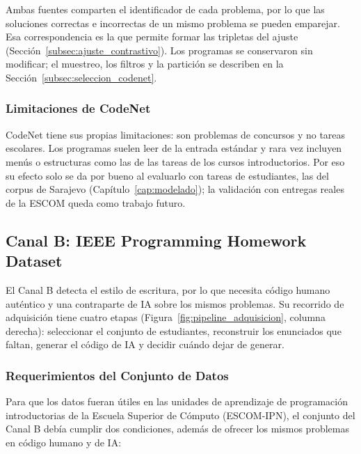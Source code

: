 Ambas fuentes comparten el identificador de cada problema, por lo que las soluciones correctas e incorrectas de un mismo problema se pueden emparejar. Esa correspondencia es la que permite formar las tripletas del ajuste (Sección~\ref{subsec:ajuste_contrastivo}). Los programas se conservaron sin modificar; el muestreo, los filtros y la partición se describen en la Sección~\ref{subsec:seleccion_codenet}.

\subsubsection{Limitaciones de CodeNet}
\label{subsec:limitaciones_codenet}

CodeNet tiene sus propias limitaciones: son problemas de concursos y no tareas escolares. Los programas suelen leer de la entrada estándar y rara vez incluyen menús o estructuras como las de las tareas de los cursos introductorios. Por eso su efecto solo se da por bueno al evaluarlo con tareas de estudiantes, las del corpus de Sarajevo (Capítulo~\ref{cap:modelado}); la validación con entregas reales de la ESCOM queda como trabajo futuro.

\subsection{Canal B: IEEE Programming Homework Dataset}
\label{subsec:adquisicion_canal_b}

El Canal B detecta el estilo de escritura, por lo que necesita código humano auténtico y una contraparte de IA sobre los mismos problemas. Su recorrido de adquisición tiene cuatro etapas (Figura~\ref{fig:pipeline_adquisicion}, columna derecha): seleccionar el conjunto de estudiantes, reconstruir los enunciados que faltan, generar el código de IA y decidir cuándo dejar de generar.

\subsubsection{Requerimientos del Conjunto de Datos}
\label{subsec:requerimientos_dataset}

Para que los datos fueran útiles en las unidades de aprendizaje de programación introductorias de la Escuela Superior de Cómputo (ESCOM-IPN), el conjunto del Canal B debía cumplir dos condiciones, además de ofrecer los mismos problemas en código humano y de IA:

